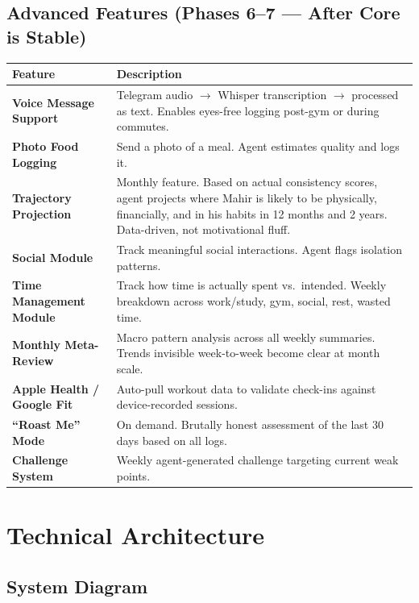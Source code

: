 \documentclass[12pt, a4paper]{article}
\begin{document}
\subsection{Advanced Features (Phases 6--7 --- After Core is Stable)}

\begin{longtable}{>{\bfseries}p{4cm} p{10cm}}
\toprule
Feature & Description \\
\midrule
Voice Message Support & Telegram audio $\rightarrow$ Whisper transcription $\rightarrow$ processed as text. Enables eyes-free logging post-gym or during commutes. \\
\addlinespace
Photo Food Logging & Send a photo of a meal. Agent estimates quality and logs it. \\
\addlinespace
Trajectory Projection & Monthly feature. Based on actual consistency scores, agent projects where Mahir is likely to be physically, financially, and in his habits in 12 months and 2 years. Data-driven, not motivational fluff. \\
\addlinespace
Social Module & Track meaningful social interactions. Agent flags isolation patterns. \\
\addlinespace
Time Management Module & Track how time is actually spent vs.\ intended. Weekly breakdown across work/study, gym, social, rest, wasted time. \\
\addlinespace
Monthly Meta-Review & Macro pattern analysis across all weekly summaries. Trends invisible week-to-week become clear at month scale. \\
\addlinespace
Apple Health / Google Fit & Auto-pull workout data to validate check-ins against device-recorded sessions. \\
\addlinespace
``Roast Me'' Mode & On demand. Brutally honest assessment of the last 30 days based on all logs. \\
\addlinespace
Challenge System & Weekly agent-generated challenge targeting current weak points. \\
\bottomrule
\end{longtable}

\section{Technical Architecture}

\subsection{System Diagram}
\end{document}
